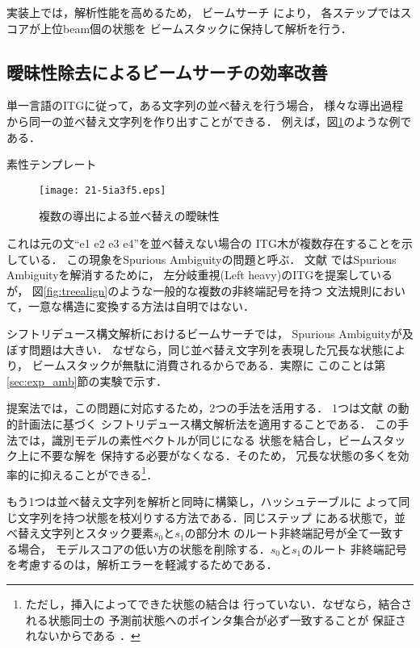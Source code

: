 \documentclass[japanese]{jnlp_1.4}
\begin{document}
実装上では，解析性能を高めるため，
ビームサーチ \cite{Y-Zhang:08}により，
各ステップではスコアが上位beam個の状態を
ビームスタックに保持して解析を行う．


\subsection{曖昧性除去によるビームサーチの効率改善}
\label{sec:amb}

単一言語のITGに従って，ある文字列の並べ替えを行う場合，
様々な導出過程から同一の並べ替え文字列を作り出すことができる．
例えば，図\ref{fig:amb}のような例である．

\begin{table}[t]
\caption{素性テンプレート}

\label{tab:feats}
\end{table}
\begin{figure}[t]
\begin{center}
\texttt{[image: 21-5ia3f5.eps]}
\end{center}
\caption{複数の導出による並べ替えの曖昧性}
\label{fig:amb}
\end{figure}

これは元の文``e1 e2 e3 e4''を並べ替えない場合の
ITG木が複数存在することを示している．
この現象をSpurious Ambiguityの問題と呼ぶ．
文献 \cite{Wu:97}ではSpurious Ambiguityを解消するために，
左分岐重視(Left heavy)のITGを提案しているが，
図\ref{fig:treealign}のような一般的な複数の非終端記号を持つ
文法規則において，一意な構造に変換する方法は自明ではない．

シフトリデュース構文解析におけるビームサーチでは，
Spurious Ambiguityが及ぼす問題は大きい．
なぜなら，同じ並べ替え文字列を表現した冗長な状態により，
ビームスタックが無駄に消費されるからである．実際に
このことは第\ref{sec:exp_amb}節の実験で示す．

提案法では，この問題に対応するため，2つの手法を活用する．
1つは文献 \cite{Huang:10}の動的計画法に基づく
シフトリデュース構文解析法を適用することである．
この手法では，識別モデルの素性ベクトルが同じになる
状態を結合し，ビームスタック上に不要な解を
保持する必要がなくなる．そのため，
冗長な状態の多くを効率的に抑えることができる\footnote{ただし，挿入によってできた状態の結合は
行っていない．なぜなら，結合される状態同士の
予測前状態へのポインタ集合が必ず一致することが
保証されないからである \cite{Huang:10}．}．

もう1つは並べ替え文字列を解析と同時に構築し，ハッシュテーブルに
よって同じ文字列を持つ状態を枝刈りする方法である．同じステップ
にある状態で，並べ替え文字列とスタック要素$s_{0}$と$s_{1}$の部分木
のルート非終端記号が全て一致する場合，
モデルスコアの低い方の状態を削除する．$s_{0}$と$s_{1}$のルート
非終端記号を考慮するのは，解析エラーを軽減するためである．
\end{document}
